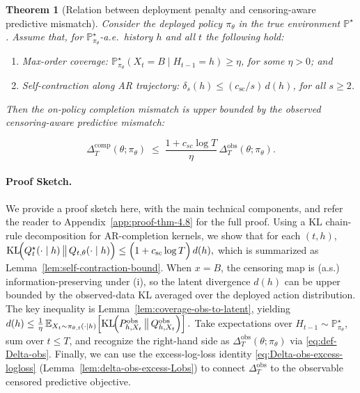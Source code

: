 \documentclass[11pt]{article}
\newtheorem{theorem}{Theorem}
\renewcommand{\P}{\mathbb{P}}
\DeclareMathOperator{\KL}{KL}
\begin{document}
\begin{theorem}[Relation between deployment penalty and censoring-aware predictive mismatch]
\label{thm:completion_to_ovserved}
Consider the deployed policy $\pi_\theta$ in the true environment $\P^\star$.
Assume that, for $\P^\star_{\pi_\theta}$-a.e.\ history $h$ and all $t$ the following hold:
\begin{enumerate}
\item Max-order coverage: $\P^\star_{\pi_\theta}(X_t=B\mid H_{t-1}=h)\ge \eta$, for some $\eta>0$; and
\item Self-contraction along AR trajectory: $\delta_s(h)\le (c_{\mathrm{sc}}/s)\,d(h)$, for all $s\ge 2$.
\end{enumerate}


Then the on-policy completion mismatch is upper bounded by the observed censoring-aware predictive mismatch:



\begin{equation}
\label{eq:completion_to_ovserved}
\Delta_T^{\mathrm{comp}}(\theta;\pi_\theta)
\;\le\; \frac{1 + c_{sc} \log T}{\eta}\,\Delta_T^{\mathrm{obs}}(\theta;\pi_\theta).
\end{equation}
\end{theorem}

\paragraph{Proof Sketch.}
We provide a proof sketch here, with the main technical components, and refer the reader to Appendix~\ref{app:proof-thm-4.8} for the full proof. Using a KL chain-rule decomposition for AR-completion kernels, we show that for each $(t,h)$,
\(
\KL\!\Bigl(Q_t^\star(\cdot\mid h)\,\big\|\,Q_{t,\theta}(\cdot\mid h)\Bigr)
\le
\Bigl(1+c_{\mathrm{sc}}\log T\Bigr)\,d(h),
\)
which is summarized as Lemma~\ref{lem:self-contraction-bound}. When $x=B$, the censoring map is (a.s.) information-preserving under (i), so the latent divergence $d(h)$
can be upper bounded by the observed-data KL averaged over the deployed action distribution.
The key inequality is Lemma~\ref{lem:coverage-obs-to-latent}, yielding
\(
d(h)
\le
\frac{1}{\eta}\,
\mathbb{E}_{X_t\sim \pi_{\theta,t}(\cdot\mid h)}
\!\left[
\KL\!\Bigl(P^{\mathrm{obs}}_{h,X_t}\,\big\|\,Q^{\mathrm{obs}}_{h,X_t}\Bigr)
\right].
\)
Take expectations over $H_{t-1}\sim \P^\star_{\pi_\theta}$, sum over $t\le T$, and recognize the right-hand side
as $\Delta^{\mathrm{obs}}_T(\theta;\pi_\theta)$ via \eqref{eq:def-Delta-obs}.
Finally, we can use the excess-log-loss identity \eqref{eq:Delta-obs-excess-logloss} (Lemma~\ref{lem:delta-obs-excess-Lobs}) to connect
$\Delta^{\mathrm{obs}}_T$ to the observable censored predictive objective.
\end{document}
